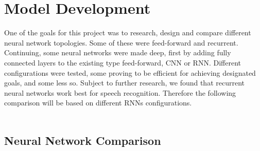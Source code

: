 \chapter{Model Development}\label{ch:model_development}
One of the goals for this project was to research, design and compare different neural network topologies. 
Some of these were feed-forward and recurrent.
Continuing, some neural networks were made deep, first by adding fully connected layers to the existing type feed-forward, CNN or RNN.
Different configurations were tested, some proving to be efficient for achieving designated goals, and some less so.
Subject to further research, we found that recurrent neural networks work best for speech recognition.
Therefore  the following comparison will be based on different RNNs configurations.\\\\

\section{Neural Network Comparison}\label{sec:NNComparison}

